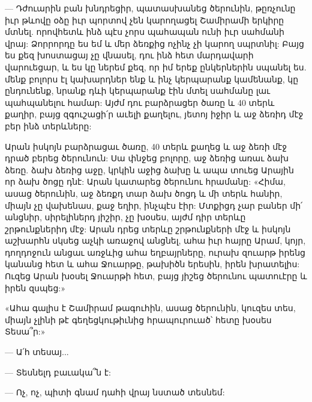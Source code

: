 \documentclass{article}
\begin{document}
{— Դժուարին բան խնդրեցիր, պատասխանեց ծերունին, թըռչունը իւր թևովը օձը իւր պորտով չեն կարողացել Շամիրամի երկիրը մտնել. որովհետև ինձ պէս չորս պահապան ունի իւր սահմանի վրայ: Ձորրորդը ես եմ և մեր ձեռքից ոչինչ չի կարող սպրտնիլ: Բայց ես քեզ խոստացայ չը վնասել, դու ինձ հետ մարդավարի վարուեցար, և ես կը ներեմ քեզ, որ իմ երեք ընկերներին սպանել ես. մենք բոլորս էլ կախարդներ ենք և ինչ կերպարանք կամենանք, կը ընդունենք, նրանք դևի կերպարանք էին մտել սահմանը լաւ պահպանելու համար: Այժմ դու բարձրացեր ծառը և 40 տերև քաղիր, բայց զգուշացի՛ր աւելի քաղելու, յետոյ իջիր և աջ ձեռիդ մէջ բեր ինձ տերևները:

Արան իսկոյն բարձրացաւ ծառը, 40 տերև քաղեց և աջ ձեռի մէջ դրած բերեց ծերունուն: Սա փնջեց բոլորը, աջ ձեռից առաւ ձախ ձեռը. ձախ ձեռից աջը, կրկին աջից ձախը և ապա տուեց Արային որ ձախ ծոցը դնէ: Արան կատարեց ծերունու հրամանը: «Հիմա, ասաց ծերունին, աջ ձեռքդ տար ձախ ծոցդ և մի տերև հանիր, միայն չը վախենաս, քաջ եղիր, ինչպէս էիր: Մտքիցդ չար բաներ մի՛ անցնիր, սիրելիներդ յիշիր, չը խօսես, այժմ դիր տերևը շրթունքներիդ մէջ: Արան դրեց տերևը շրթունքների մէջ և իսկոյն աշխարհն սկսեց աչկի առաջով անցնել, ահա իւր հայրը Արամ, կոյր, դողդոջուն անցաւ առջևից ահա եղբայրները, ուրախ զուարթ իրենց կանանց հետ և ահա Ջուարթը, թախիծն երեսին, իրեն խրատելիս: Ուզեց Արան խօսել Ջուարթի հետ, բայց յիշեց ծերունու պատուէրը և իրեն զսպեց:»

«Ահա գալիս է Շամիրամ թագուհին, ասաց ծերունին, կուզես տես, միայն չլինի թէ գեղեցկութիւնից հրապուրուած՝ հետը խօսես Տեսա՞ր:»

— Ա՛հ տեսայ...

— Տեսնելդ բաւակա՞ն է:

— Ոչ, ոչ, պիտի գնամ դահի վրայ նստած տեսնեմ:

}
\end{document}
